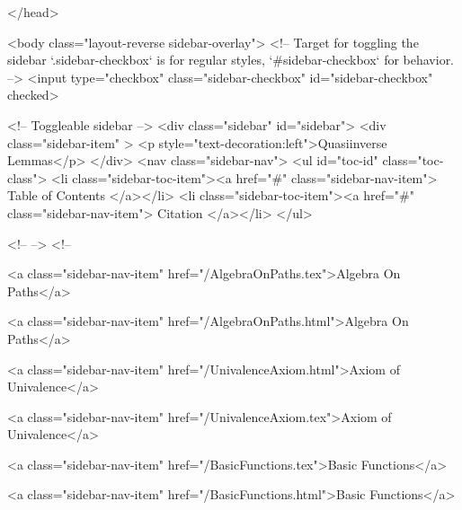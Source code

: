   
</head>




  <body class="layout-reverse sidebar-overlay">
    <!-- Target for toggling the sidebar `.sidebar-checkbox` is for regular
     styles, `#sidebar-checkbox` for behavior. -->
<input type="checkbox" class="sidebar-checkbox" id="sidebar-checkbox" checked>

<!-- Toggleable sidebar -->
<div class="sidebar" id="sidebar">
  <div class="sidebar-item" >
    <p style="text-decoration:left">Quasiinverse Lemmas</p>
  </div>
  <nav class="sidebar-nav">
    <ul id="toc-id" class="toc-class">
  <li class="sidebar-toc-item"><a href="#" class="sidebar-nav-item"> Table of Contents </a></li>
  <li class="sidebar-toc-item"><a href="#" class="sidebar-nav-item"> Citation </a></li>
</ul>


    <!--  -->
    <!-- 
      
    
      
    
      
    
      
        
      
    
      
        
          <a class="sidebar-nav-item" href="/AlgebraOnPaths.tex">Algebra On Paths</a>
        
      
    
      
        
          <a class="sidebar-nav-item" href="/AlgebraOnPaths.html">Algebra On Paths</a>
        
      
    
      
        
          <a class="sidebar-nav-item" href="/UnivalenceAxiom.html">Axiom of Univalence</a>
        
      
    
      
        
          <a class="sidebar-nav-item" href="/UnivalenceAxiom.tex">Axiom of Univalence</a>
        
      
    
      
        
          <a class="sidebar-nav-item" href="/BasicFunctions.tex">Basic Functions</a>
        
      
    
      
        
          <a class="sidebar-nav-item" href="/BasicFunctions.html">Basic Functions</a>
        
      
    

